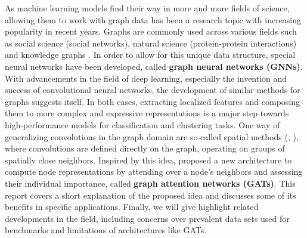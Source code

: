 \label{chapter:introduction}

As machine learning models find their way in more and more fields of science, allowing them to work with graph data has been a research topic with increasing popularity in recent years. Graphs are commonly used across various fields such as social science (social networks), natural science (protein-protein interactions) and knowledge graphs \cite{zhou2021graph}. In order to allow for this unique data structure, special neural networks have been developed, called \textbf{graph neural networks (GNNs)}. With advancements in the field of deep learning, especially the invention and success of convolutional neural networks, the development of similar methods for graphs suggests itself. In both cases, extracting localized features and composing them to more complex and expressive representations is a major step towards high-performance models for classification and clustering tasks. One way of generalizing convolutions in the graph domain are so-called spatial methods (\cite{hamilton2018inductive}, \cite{monti2016geometric}), where convolutions are defined directly on the graph, operating on groups of spatially close neighbors. Inspired by this idea, \cite{velickovic2018graph} proposed a new architecture to compute node representations by attending over a node's neighbors and assessing their individual importance, called \textbf{graph attention networks (GATs)}. This report covers a short explanation of the proposed idea and discusses some of its benefits in specific applications. Finally, we will give highlight related developments in the field, including concerns over prevalent data sets used for benchmarks and limitations of architectures like GATs.
\bigskip
